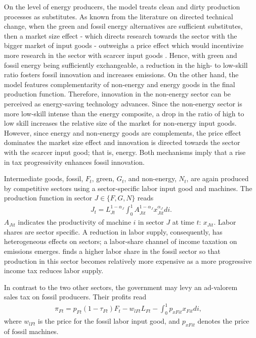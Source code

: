 On the level of energy producers, the model treats clean and dirty production processes as substitutes. As known from the literature on directed technical change, when the green and fossil energy alternatives are sufficient substitutes, then a market size effect - which directs research towards the sector with the bigger market of input goods - outweighs a price effect which would incentivize more research in the sector with scarcer input goods \citep{Hemous2021DirectedEconomics}. Hence, with green and fossil energy being sufficiently exchangeable, a reduction in the high- to low-skill ratio fosters fossil innovation and increases emissions. 
On the other hand, the model features complementarity of non-energy and energy goods in the final production function. Therefore, innovation in the non-energy sector can be perceived as energy-saving technology advances. Since the non-energy sector is more low-skill intense than the energy composite, a drop in the ratio of high to low skill increases the relative size of the market for non-energy input goods. However, since energy and non-energy goods are complements, the price effect dominates the market size effect and innovation is directed towards the sector with the scarcer input good; that is, energy. Both mechanisms imply that a rise in tax progressivity enhances fossil innovation. 

Intermediate goods, fossil, $F_t$, green, $G_t$, and non-energy, $N_t$, are again produced by competitive sectors using a sector-specific labor input good and machines. The production function in sector $J\in \{F,G,N\}$ reads
\begin{align}
&J_{t}= L_{Jt}^{1-\alpha_J}\int_{0}^{1}A_{Jit}^{1-\alpha_J}x_{Jit}^{\alpha_J} di.
\end{align}
$A_{Jit}$ indicates the productivity of machine $i$ in sector $J$ at time $t$: $x_{Jit}$. 
Labor shares are sector specific. A reduction in labor supply, consequently, has heterogeneous effects on sectors; a labor-share channel of income taxation on emissions emerges. \cite{Fried2018ClimateAnalysis} finds a higher labor share in the fossil sector so that production in this sector becomes relatively more expensive as a more progressive income tax reduces labor supply.  

In contrast to the two other sectors, the government may levy an ad-valorem sales tax on fossil producers. Their profits read
\begin{align}
\pi_{Ft}=p_{Ft}(1-\tau_{Ft})F_t-w_{lFt}L_{Ft}-\int_{0}^{1}p_{xFit}x_{Fit}di,
\end{align}
where $w_{lFt}$ is the price for the fossil labor input good, and $p_{xFit}$ denotes the price of fossil machines. 

